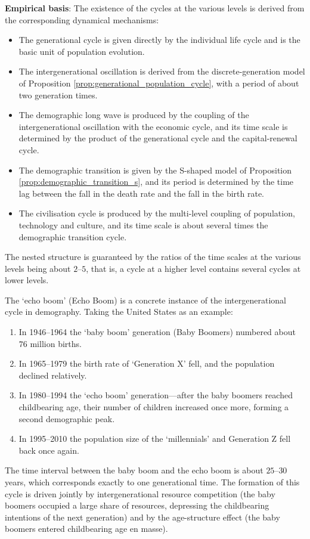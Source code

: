 \begin{remark}
\textbf{Empirical basis}:
The existence of the cycles at the various levels is derived from the corresponding dynamical mechanisms:
\begin{itemize}
    \item The generational cycle is given directly by the individual life cycle and is the basic unit of population evolution.
    \item The intergenerational oscillation is derived from the discrete-generation model of Proposition \ref{prop:generational_population_cycle}, with a period of about two generation times.
    \item The demographic long wave is produced by the coupling of the intergenerational oscillation with the economic cycle, and its time scale is determined by the product of the generational cycle and the capital-renewal cycle.
    \item The demographic transition is given by the S-shaped model of Proposition \ref{prop:demographic_transition_s}, and its period is determined by the time lag between the fall in the death rate and the fall in the birth rate.
    \item The civilisation cycle is produced by the multi-level coupling of population, technology and culture, and its time scale is about several times the demographic transition cycle.
\end{itemize}
The nested structure is guaranteed by the ratios of the time scales at the various levels being about $2$--$5$, that is, a cycle at a higher level contains several cycles at lower levels.
\end{remark}

\begin{example}\label{ex:echo_boom}
The `echo boom' (Echo Boom) is a concrete instance of the intergenerational cycle in demography. Taking the United States as an example:
\begin{enumerate}[label=(\roman*)]
    \item In 1946--1964 the `baby boom' generation (Baby Boomers) numbered about $76$ million births.
    \item In 1965--1979 the birth rate of `Generation X' fell, and the population declined relatively.
    \item In 1980--1994 the `echo boom' generation---after the baby boomers reached childbearing age, their number of children increased once more, forming a second demographic peak.
    \item In 1995--2010 the population size of the `millennials' and Generation Z fell back once again.
\end{enumerate}
The time interval between the baby boom and the echo boom is about $25$--$30$ years, which corresponds exactly to one generational time. The formation of this cycle is driven jointly by intergenerational resource competition (the baby boomers occupied a large share of resources, depressing the childbearing intentions of the next generation) and by the age-structure effect (the baby boomers entered childbearing age en masse).
\end{example}

